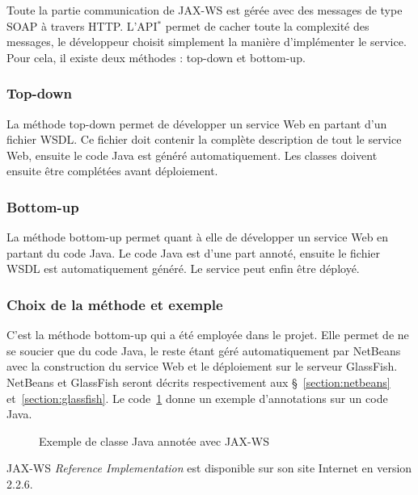 Toute la partie communication de JAX-WS est g\'er\'ee avec des messages de type SOAP \`a travers HTTP.
L'API$^*$ permet de cacher toute la complexit\'e des messages, le d\'eveloppeur choisit simplement la mani\`ere d'impl\'ementer le service. 
Pour cela, il existe deux m\'ethodes : top-down et bottom-up.

\subsubsection{Top-down}

La m\'ethode top-down permet de d\'evelopper un service Web en partant d'un fichier WSDL.
Ce fichier doit contenir la compl\`ete description de tout le service Web, ensuite le code Java est g\'en\'er\'e automatiquement.
Les classes doivent ensuite \^etre compl\'et\'ees avant d\'eploiement.

\subsubsection{Bottom-up}

La m\'ethode bottom-up permet quant \`a elle de d\'evelopper un service Web en partant du code Java.
Le code Java est d'une part annot\'e, ensuite le fichier WSDL est automatiquement g\'en\'er\'e.
Le service peut enfin \^etre d\'eploy\'e.

\subsubsection{Choix de la m\'ethode et exemple}

C'est la m\'ethode bottom-up qui a \'et\'e employ\'ee dans le projet.
Elle permet de ne se soucier que du code Java, le reste \'etant g\'er\'e automatiquement par NetBeans avec la construction du service Web et le d\'eploiement sur le serveur GlassFish.
NetBeans et GlassFish seront d\'ecrits respectivement aux \S~\ref{section:netbeans} et~\ref{section:glassfish}.
Le code~\ref{code:exempleJAXWS} donne un exemple d'annotations sur un code Java.

\clearpage

\begin{figure}[!ht]
	
	\caption{Exemple de classe Java annot\'ee avec JAX-WS}
	\label{code:exempleJAXWS}

\end{figure}

JAX-WS \textit{Reference Implementation} est disponible sur son site Internet\cite{biblio:siteJAXWS} en version 2.2.6.

\clearpage
